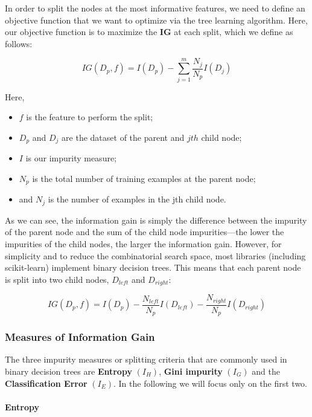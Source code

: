 \documentclass{article}
\providecommand{\tightlist}{%
      \setlength{\itemsep}{0pt}\setlength{\parskip}{0pt}}
\begin{document}
    In order to split the nodes at the most informative features, we need to
define an objective function that we want to optimize via the tree
learning algorithm. Here, our objective function is to maximize the
\textbf{IG} at each split, which we define as follows:

\begin{equation}
IG(D_p, f) = I(D_p) - \sum\limits_{j=1}^m \frac{N_j}{N_p} I(D_j)
\end{equation}

Here,

\begin{itemize}
\tightlist
\item
  \(f\) is the feature to perform the split;
\item
  \(𝐷_𝑝\) and \(𝐷_𝑗\) are the dataset of the parent and \(jth\) child
  node;
\item
  \(I\) is our impurity measure;
\item
  \(𝑁_𝑝\) is the total number of training examples at the parent node;
\item
  and \(𝑁_𝑗\) is the number of examples in the jth child node.
\end{itemize}

As we can see, the information gain is simply the difference between the
impurity of the parent node and the sum of the child node
impurities---the lower the impurities of the child nodes, the larger the
information gain. However, for simplicity and to reduce the
combinatorial search space, most libraries (including scikit-learn)
implement binary decision trees. This means that each parent node is
split into two child nodes, \(D_{left}\) and \(D_{right}\):

\begin{equation}
IG(D_p, f) = I(D_p) - \frac{N_{left}}{N_p}I(D_{left}) -
\frac{N_{right}}{N_p} I(D_{right})
\end{equation}

    \subsubsection{Measures of Information
Gain}\label{measures-of-information-gain}

The three impurity measures or splitting criteria that are commonly used
in binary decision trees are \textbf{Entropy} \((𝐼_𝐻)\), \textbf{Gini
impurity} \((𝐼_𝐺)\) and the \textbf{Classification Error} \((𝐼_𝐸)\). In
the following we will focus only on the first two.

    \paragraph{Entropy}\label{entropy}
\end{document}

